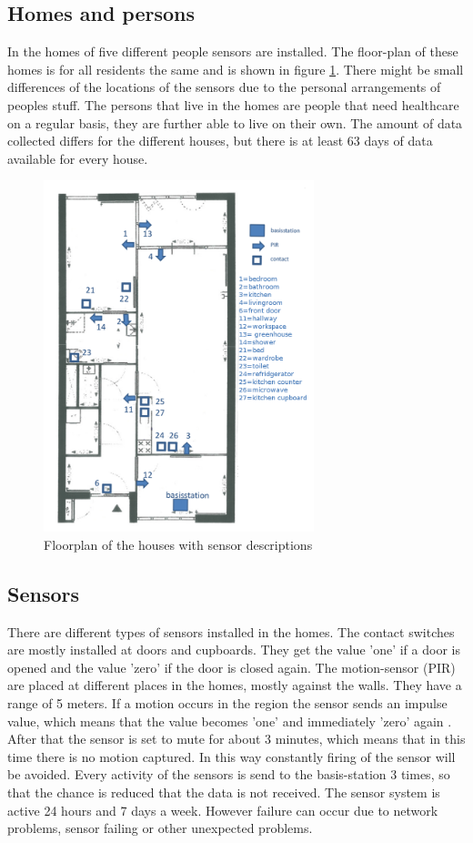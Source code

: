 \documentclass[11pt,a4paper]{article}
\begin{document}
\subsection{Homes and persons}
In the homes of five different people sensors are installed. The floor-plan of these homes is for all residents the same and is shown in figure \ref{fig:floorplan}. There might be small differences of the locations of the sensors due to the personal arrangements of peoples stuff.
The persons that live in the homes are people that need healthcare on a regular basis, they are further able to live on their own. The amount of data collected differs for the different houses, but there is at least 63 days of data available for every house.

\begin{figure}[h]
\centering
 \includegraphics[width=0.7\textwidth]{Pictures/floorplan.png}
 \caption{Floorplan of the houses with sensor descriptions}
 \label{fig:floorplan}
\end{figure}


\subsection{Sensors}
There are different types of sensors installed in the homes. The contact switches are mostly installed at doors and cupboards. They get the value 'one' if a door is opened and the value 'zero' if the door is closed again.
The motion-sensor (PIR) are placed at different places in the homes, mostly against the walls. They have a range of 5 meters. If a motion occurs in the region the sensor sends an impulse value, which means that the value becomes 'one' and immediately 'zero' again . After that the sensor is set to mute for about 3 minutes, which means that in this time there is no motion captured. In this way constantly firing of the sensor will be avoided. Every activity of the sensors is send to the basis-station 3 times, so that the chance is reduced that the data is not received. The sensor system is active 24 hours and 7 days a week. However failure can occur due to network problems, sensor failing or other unexpected problems.
\end{document}
